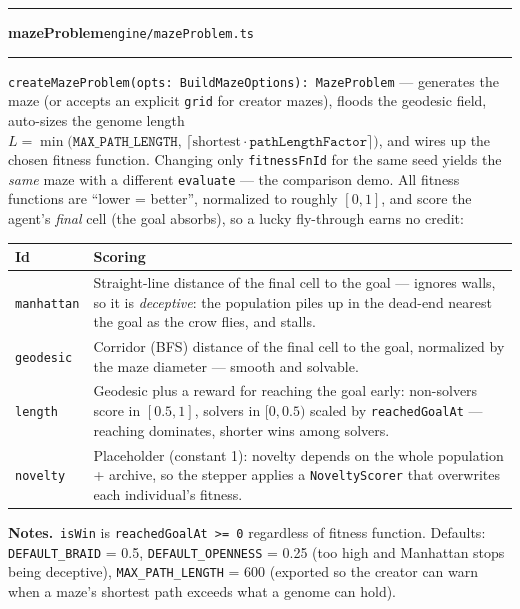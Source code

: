 \documentclass[11pt,a4paper]{report}
\newcommand{\srcfile}[1]{\texttt{\small #1}}   %
\newcommand{\ts}[1]{\texttt{#1}}               %
\newenvironment{apientry}[2]{%
  \par\medskip\noindent
  \begin{minipage}{\textwidth}
  \hrule\vspace{0.6ex}
  {\large\ttfamily\bfseries #1}\hfill{\footnotesize\srcfile{#2}}
  \vspace{0.4ex}\hrule\medskip
}{%
  \end{minipage}\par\medskip
}
\newcommand{\apifield}[1]{\par\smallskip\noindent\textbf{#1.}\ }
\begin{document}
\begin{apientry}{mazeProblem}{engine/mazeProblem.ts}
\ts{createMazeProblem(opts: BuildMazeOptions): MazeProblem} --- generates
the maze (or accepts an explicit \ts{grid} for creator mazes), floods the
geodesic field, auto-sizes the genome length
$L = \min\bigl(\ts{MAX\_PATH\_LENGTH},\, \lceil \mathrm{shortest} \cdot
\ts{pathLengthFactor} \rceil\bigr)$, and wires up the chosen fitness
function. Changing only \ts{fitnessFnId} for the same seed yields the
\emph{same} maze with a different \ts{evaluate} --- the comparison demo.
All fitness functions are ``lower = better'', normalized to roughly
$[0,1]$, and score the agent's \emph{final} cell (the goal absorbs), so a
lucky fly-through earns no credit:
\begin{center}
\begin{tabularx}{\textwidth}{l X}
  \toprule
  \textbf{Id} & \textbf{Scoring} \\
  \midrule
  \ts{manhattan} & Straight-line distance of the final cell to the goal
    --- ignores walls, so it is \emph{deceptive}: the population piles up
    in the dead-end nearest the goal as the crow flies, and stalls. \\
  \ts{geodesic}  & Corridor (BFS) distance of the final cell to the goal,
    normalized by the maze diameter --- smooth and solvable. \\
  \ts{length}    & Geodesic plus a reward for reaching the goal early:
    non-solvers score in $[0.5, 1]$, solvers in $[0, 0.5)$ scaled by
    \ts{reachedGoalAt} --- reaching dominates, shorter wins among
    solvers. \\
  \ts{novelty}   & Placeholder (constant 1): novelty depends on the whole
    population + archive, so the stepper applies a \ts{NoveltyScorer}
    that overwrites each individual's fitness. \\
  \bottomrule
\end{tabularx}
\end{center}
\apifield{Notes}\ts{isWin} is \ts{reachedGoalAt >= 0} regardless of
fitness function. Defaults: \ts{DEFAULT\_BRAID} = 0.5,
\ts{DEFAULT\_OPENNESS} = 0.25 (too high and Manhattan stops being
deceptive), \ts{MAX\_PATH\_LENGTH} = 600 (exported so the creator can
warn when a maze's shortest path exceeds what a genome can hold).
\end{apientry}
\end{document}
